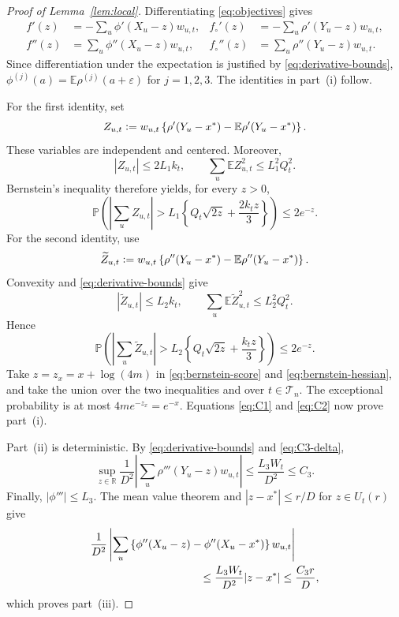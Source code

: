 \documentclass[11pt]{article}
\newcommand{\E}{\mathbb{E}}
\newcommand{\Pp}{\mathbb{P}}
\newcommand{\R}{\mathbb{R}}
\newcommand{\eqdef}{\mathrel{\vcentcolon=}}
\newcommand{\rhohu}{\rho}
\newcommand{\rhohum}{\phi}
\newcommand{\Signal}{X}
\newcommand{\Data}{Y}
\newcommand{\DFN}{D}
\newcommand{\fs}{f}
\newcommand{\fp}{f_{\circ}}
\newcommand{\xs}{x^{*}}
\newcommand{\xx}{x}
\begin{document}
\begin{proof}[Proof of Lemma~\ref{lem:local}]
Differentiating \eqref{eq:objectives} gives
\begin{align*}
  \fs'(z)&=-\sum_u\rhohum'(\Signal_u-z)w_{u,t},
  &
  \fp'(z)&=-\sum_u\rhohu'(\Data_u-z)w_{u,t},\\
  \fs''(z)&=\sum_u\rhohum''(\Signal_u-z)w_{u,t},
  &
  \fp''(z)&=\sum_u\rhohu''(\Data_u-z)w_{u,t}.
\end{align*}
Since differentiation under the expectation is justified by
\eqref{eq:derivative-bounds},
\(\rhohum^{(j)}(a)=\E\rhohu^{(j)}(a+\varepsilon)\) for
\(j=1,2,3\).  The identities in part~(i) follow.

For the first identity, set
\[
  Z_{u,t}\eqdef w_{u,t}
  \left\{\rhohu'(\Data_u-\xs)
  -\E\rhohu'(\Data_u-\xs)\right\}.
\]
These variables are independent and centered.  Moreover,
\[
  |Z_{u,t}|\leq2L_1k_t,
  \qquad
  \sum_u\E Z_{u,t}^2\leq L_1^2Q_t^2.
\]
Bernstein's inequality therefore yields, for every \(z>0\),
\begin{equation}
  \Pp\left(
    \left|\sum_uZ_{u,t}\right|>
    L_1\left\{Q_t\sqrt{2z}+\frac{2k_tz}{3}\right\}
  \right)
  \leq2e^{-z}.
  \label{eq:bernstein-score}
\end{equation}
For the second identity, use
\[
  \widetilde Z_{u,t}\eqdef w_{u,t}
  \left\{\rhohu''(\Data_u-\xs)
  -\E\rhohu''(\Data_u-\xs)\right\}.
\]
Convexity and \eqref{eq:derivative-bounds} give
\[
  |\widetilde Z_{u,t}|\leq L_2k_t,
  \qquad
  \sum_u\E\widetilde Z_{u,t}^2\leq L_2^2Q_t^2.
\]
Hence
\begin{equation}
  \Pp\left(
    \left|\sum_u\widetilde Z_{u,t}\right|>
    L_2\left\{Q_t\sqrt{2z}+\frac{k_tz}{3}\right\}
  \right)
  \leq2e^{-z}.
  \label{eq:bernstein-hessian}
\end{equation}
Take \(z=z_{\xx}=\xx+\log(4m)\) in
\eqref{eq:bernstein-score} and \eqref{eq:bernstein-hessian}, and take the
union over the two inequalities and over \(t\in\mathcal T_n\).  The exceptional
probability is at most
\(4m e^{-z_{\xx}}=e^{-\xx}\).  Equations \eqref{eq:C1} and
\eqref{eq:C2} now prove part~(i).

Part~(ii) is deterministic.  By \eqref{eq:derivative-bounds} and
\eqref{eq:C3-delta},
\[
  \sup_{z\in\R}\frac{1}{\DFN^2}
  \left|\sum_u\rhohu'''(\Data_u-z)w_{u,t}\right|
  \leq\frac{L_3W_t}{\DFN^2}\leq C_3.
\]
Finally, \(|\rhohum'''|\leq L_3\).  The mean value theorem and
\(|z-\xs|\leq r/\DFN\) for \(z\in U_t(r)\) give
\begin{align*}
  &\frac{1}{\DFN^2}
  \left|\sum_u
    \left\{\rhohum''(\Signal_u-z)
    -\rhohum''(\Signal_u-\xs)\right\}w_{u,t}\right|\\
  &\hspace{35mm}\leq
    \frac{L_3W_t}{\DFN^2}|z-\xs|
    \leq\frac{C_3r}{\DFN},
\end{align*}
which proves part~(iii).
\end{proof}
\end{document}
